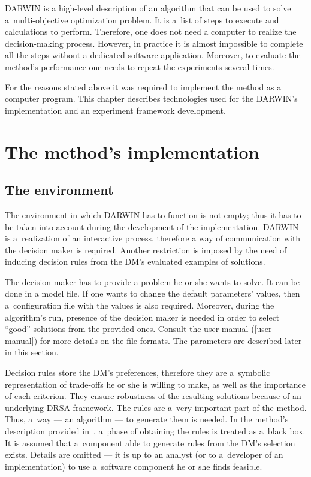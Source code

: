 DARWIN is a high-level description of an algorithm that can be used to solve
a~multi-objective optimization problem. It is a~list of steps to execute and
calculations to perform. Therefore, one does not need a computer to realize
the decision-making process. However, in practice it is almost impossible to
complete all the steps without a dedicated software application. Moreover, to
evaluate the method's performance one needs to repeat the experiments several
times.

For the reasons stated above it was required to implement the method as a
computer program. This chapter describes technologies used for the DARWIN's
implementation and an experiment framework development.

\section{The method's implementation}

\subsection{The environment}
\label{environ}

The environment in which DARWIN has to function is not empty; thus it has to
be taken into account during the development of the implementation. DARWIN is
a~realization of an interactive process, therefore a way of communication with
the decision maker is required. Another restriction is imposed by the need of
inducing decision rules from the DM's evaluated examples of solutions.

The decision maker has to provide a problem he or she wants to solve. It can
be done in a model file. If one wants to change the default parameters'
values, then a~configuration file with the values is also required. Moreover,
during the algorithm's run, presence of the decision maker is needed in order
to select ``good'' solutions from the provided ones. Consult the user manual
(\ref{user-manual}) for more details on the file formats. The parameters are
described later in this section.

Decision rules store the DM's preferences, therefore they are a~symbolic
representation of trade-offs he or she is willing to make, as well as the
importance of each criterion. They ensure robustness of the resulting
solutions because of an underlying DRSA framework. The rules are a~very
important part of the method. Thus, a~way --- an algorithm --- to generate
them is needed. In the method's description provided in~\cite{GMS10, GMS10b,
  GMS10c}, a~phase of obtaining the rules is treated as a~black box. It is
assumed that a~component able to generate rules from the DM's selection
exists. Details are omitted --- it is up to an analyst (or to a~developer of
an implementation) to use a~software component he or she finds feasible.

